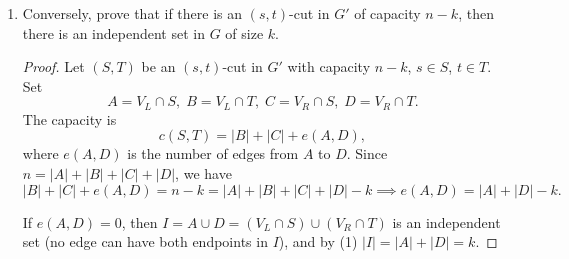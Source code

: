 \documentclass[12pt,a4paper]{article}
\theoremstyle{definition}
\begin{document}
\begin{enumerate}
\begin{enumerate}
        \begin{proof}
            Let $I\subseteq V$ be an independent set of size $k$ in $G$. 
            Define an $(s,t)$-cut $(S,T)$ in $G'$ as follows:
            \[
            S = \{s\} \cup (V_L \cap I) \cup (V_R \setminus I),\qquad
            T = (V_L \setminus I) \cup (V_R \cap I) \cup \{t\}.
            \]
            The capacity of this cut is the sum of capacities of edges going from $S$ to $T$.
            \begin{itemize}
                \item Edges $(s,u)$ with $u\in V_L$: capacity $1$, cross the cut iff $u\in T$, i.e., $u\in V_L\setminus I$. Number of such edges is $|V_L\setminus I|$.
                \item Edges $(v,t)$ with $v\in V_R$: capacity $1$, cross the cut iff $v\in S$, i.e., $v\in V_R\setminus I$. Number is $|V_R\setminus I|$.
                \item Edges $(u,v)$ with $u\in V_L, v\in V_R$: cross the cut iff $u\in S$ and $v\in T$. Here $S$ contains $V_L\cap I$, and $T$ contains $V_R\cap I$. Since $I$ is independent, there is no edge between $V_L\cap I$ and $V_R\cap I$, so no such edge crosses the cut.
            \end{itemize}
            Hence
            \[
            c(S,T) = |V_L\setminus I| + |V_R\setminus I| = (|V_L|-|V_L\cap I|)+(|V_R|-|V_R\cap I|) = n - |I| = n - k.
            \]
        \end{proof}

        \item Conversely, prove that if there is an $(s, t)$-cut in $G'$ of capacity $n−k$, then there is an independent set in $G$ of size $k$.

        \begin{proof}
            Let $(S,T)$ be an $(s,t)$-cut in $G'$ with capacity $n-k$, $s\in S$, $t\in T$. 
            Set
            \[
            A = V_L\cap S,\; B = V_L\cap T,\; C = V_R\cap S,\; D = V_R\cap T.
            \]
            The capacity is
            \[
            c(S,T) = |B| + |C| + e(A,D),
            \]
            where $e(A,D)$ is the number of edges from $A$ to $D$. Since $n = |A|+|B|+|C|+|D|$, we have
            \[
            |B|+|C|+e(A,D) = n-k = |A|+|B|+|C|+|D| - k \implies e(A,D) = |A|+|D| - k. \tag{1}
            \]
            
            If $e(A,D)=0$, then $I = A\cup D = (V_L\cap S)\cup (V_R\cap T)$ is an independent set (no edge can have both endpoints in $I$), and by (1) $|I| = |A|+|D| = k$.
            

\end{proof}
\end{enumerate}
\end{enumerate}
\end{document}
